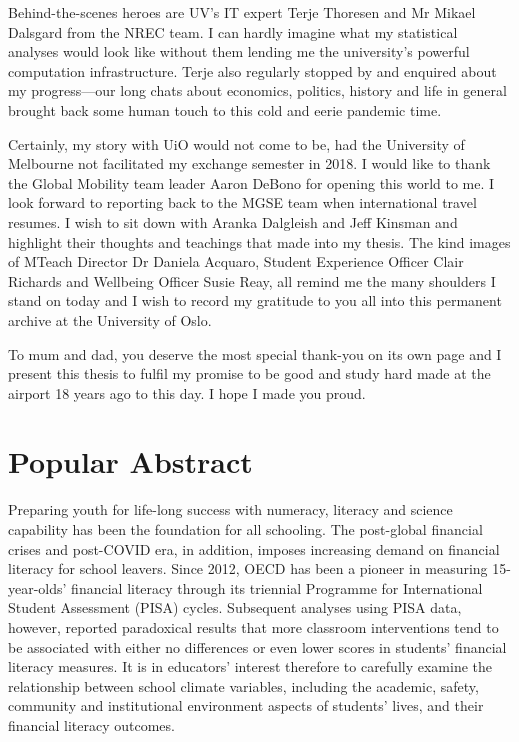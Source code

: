 \documentclass[a4paper,11pt,UKenglish,twoside,openright]{report}\usepackage[]{graphicx}\usepackage[]{color}
\begin{document}
Behind-the-scenes heroes are UV's IT expert Terje Thoresen and Mr Mikael Dalsgard from the NREC team. I can hardly imagine what my statistical analyses would look like without them lending me the university's powerful computation infrastructure. Terje also regularly stopped by and enquired about my progress---our long chats about economics, politics, history and life in general brought back some human touch to this cold and eerie pandemic time.

Certainly, my story with UiO would not come to be, had the University of Melbourne not facilitated my exchange semester in 2018. I would like to thank the Global Mobility team leader Aaron DeBono for opening this world to me. I look forward to reporting back to the MGSE team when international travel resumes. I wish to sit down with Aranka Dalgleish and Jeff Kinsman and highlight their thoughts and teachings that made into my thesis. The kind images of MTeach Director Dr Daniela Acquaro, Student Experience Officer Clair Richards and Wellbeing Officer Susie Reay, all remind me the many shoulders I stand on today and I wish to record my gratitude to you all into this permanent archive at the University of Oslo.

To mum and dad, you deserve the most special thank-you on its own page and I present this thesis to fulfil my promise to be good and study hard made at the airport 18 years ago to this day. I hope I made you proud.


\chapter*{Popular Abstract}
\label{Ab.0}

Preparing youth for life-long success with numeracy, literacy and science capability has been the foundation for all schooling. The post-global financial crises and post-COVID era, in addition, imposes increasing demand on financial literacy for school leavers. Since 2012, OECD has been a pioneer in measuring 15-year-olds' financial literacy through its triennial Programme for International Student Assessment (PISA) cycles. Subsequent analyses using PISA data, however, reported paradoxical results that more classroom interventions tend to be associated with either no differences or even lower scores in students' financial literacy measures. It is in educators' interest therefore to carefully examine the relationship between school climate variables, including the academic, safety, community and institutional environment aspects of students' lives, and their financial literacy outcomes.
\end{document}
